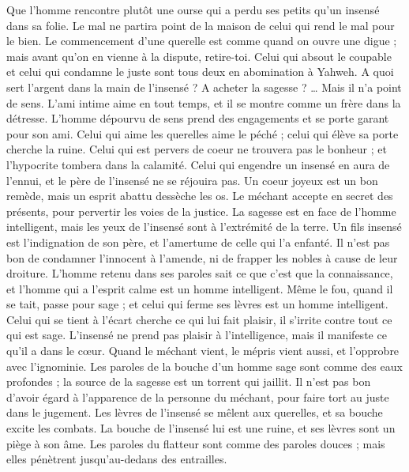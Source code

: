 \begin{multicols}{2}
Que l'homme rencontre plutôt une ourse qui a perdu ses petits qu'un insensé dans sa folie.
Le mal ne partira point de la maison de celui qui rend le mal pour le bien.
Le commencement d'une querelle est comme quand on ouvre une digue ; mais avant qu'on en vienne à la dispute, retire-toi.
Celui qui absout le coupable et celui qui condamne le juste sont tous deux en abomination à Yahweh.
A quoi sert l’argent dans la main de l’insensé ? A acheter la sagesse ? … Mais il n’a point de sens.
L'ami intime aime en tout temps, et il se montre comme un frère dans la détresse.
L’homme dépourvu de sens prend des engagements et se porte garant pour son ami.
Celui qui aime les querelles aime le péché ; celui qui élève sa porte cherche la ruine.
Celui qui est pervers de coeur ne trouvera pas le bonheur ; et l'hypocrite tombera dans la calamité.
Celui qui engendre un insensé en aura de l'ennui, et le père de l’insensé ne se réjouira pas.
Un coeur joyeux est un bon remède, mais un esprit abattu dessèche les os.
Le méchant accepte en secret des présents, pour pervertir les voies de la justice.
La sagesse est en face de l'homme intelligent, mais les yeux de l’insensé sont à l’extrémité de la terre.
Un fils insensé est l'indignation de son père, et l'amertume de celle qui l'a enfanté.
Il n'est pas bon de condamner l'innocent à l'amende, ni de frapper les nobles à cause de leur droiture.
L'homme retenu dans ses paroles sait ce que c'est que la connaissance, et l'homme qui a l’esprit calme est un homme intelligent.
Même le fou, quand il se tait, passe pour sage ; et celui qui ferme ses lèvres est un homme intelligent.
\VerseOne{}Celui qui se tient à l’écart cherche ce qui lui fait plaisir, il s’irrite contre tout ce qui est sage.
L’insensé ne prend pas plaisir à l'intelligence, mais il manifeste ce qu’il a dans le cœur.
Quand le méchant vient, le mépris vient aussi, et l’opprobre avec l'ignominie.
Les paroles de la bouche d'un homme sage sont comme des eaux profondes ; la source de la sagesse est un torrent qui jaillit.
Il n'est pas bon d'avoir égard à l'apparence de la personne du méchant, pour faire tort au juste dans le jugement.
Les lèvres de l’insensé se mêlent aux querelles, et sa bouche excite les combats.
La bouche de l’insensé lui est une ruine, et ses lèvres sont un piège à son âme.
Les paroles du flatteur sont comme des paroles douces ; mais elles pénètrent jusqu'au-dedans des entrailles.

\end{multicols}
